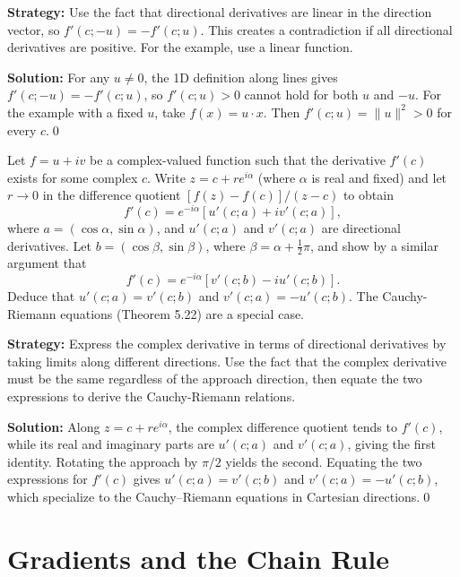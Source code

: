 \noindent\textbf{Strategy:} Use the fact that directional derivatives are linear in the direction vector, so \( f'(c; -u) = -f'(c; u) \). This creates a contradiction if all directional derivatives are positive. For the example, use a linear function.

\bigskip\noindent\textbf{Solution:}
For any $u\ne0$, the 1D definition along lines gives $f'(c;-u)=-f'(c;u)$, so $f'(c;u)>0$ cannot hold for both $u$ and $-u$. For the example with a fixed $u$, take $f(x)=u\cdot x$. Then $f'(c;u)=\|u\|^2>0$ for every $c$.\qed


\begin{problembox}
\begin{problemstatement}
Let \( f = u + iv \) be a complex-valued function such that the derivative \( f'(c) \) exists for some complex \( c \). Write \( z = c + re^{i\alpha} \) (where \( \alpha \) is real and fixed) and let \( r \to 0 \) in the difference quotient \( [f(z) - f(c)]/(z - c) \) to obtain
\[f'(c) = e^{-i\alpha}[u'(c; a) + iv'(c; a)],\]
where \( a = (\cos \alpha, \sin \alpha) \), and \( u'(c; a) \) and \( v'(c; a) \) are directional derivatives. Let \( b = (\cos \beta, \sin \beta) \), where \( \beta = \alpha + \frac{1}{2}\pi \), and show by a similar argument that
\[f'(c) = e^{-i\alpha}[v'(c; b) - iu'(c; b)].\]
Deduce that \( u'(c; a) = v'(c; b) \) and \( v'(c; a) = -u'(c; b) \). The Cauchy-Riemann equations (Theorem 5.22) are a special case.
\end{problemstatement}
\end{problembox}

\noindent\textbf{Strategy:} Express the complex derivative in terms of directional derivatives by taking limits along different directions. Use the fact that the complex derivative must be the same regardless of the approach direction, then equate the two expressions to derive the Cauchy-Riemann relations.

\bigskip\noindent\textbf{Solution:}
Along $z=c+re^{i\alpha}$, the complex difference quotient tends to $f'(c)$, while its real and imaginary parts are $u'(c;a)$ and $v'(c;a)$, giving the first identity. Rotating the approach by $\pi/2$ yields the second. Equating the two expressions for $f'(c)$ gives $u'(c;a)=v'(c;b)$ and $v'(c;a)=-u'(c;b)$, which specialize to the Cauchy–Riemann equations in Cartesian directions.\qed
\section{Gradients and the Chain Rule}

